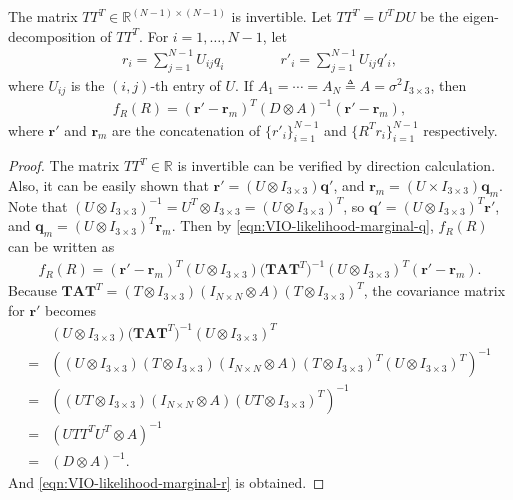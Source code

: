 \begin{theorem}
	The matrix $TT^T \in \mathbb{R}^{(N-1)\times (N-1)}$ is invertible.
	Let $TT^T = U^TDU$ be the eigen-decomposition of $TT^T$.
	For $i = 1,\ldots,N-1$, let
	\begin{align} \label{eqn:VIO-uncorrelate}
		r_i = \sum_{j=1}^{N-1} U_{ij} q_i \qquad\qquad r'_i = \sum_{j=1}^{N-1} U_{ij} q'_i,
	\end{align}
	where $U_{ij}$ is the $(i,j)$-th entry of $U$.
	If $A_1 = \cdots = A_N \triangleq A = \sigma^2I_{3\times 3}$, then
	\begin{align} \label{eqn:VIO-likelihood-marginal-r}
		f_R(R) = (\bm{r}'-\bm{r}_m)^T (D\otimes A)^{-1} (\bm{r}'-\bm{r}_m),
	\end{align}
	where $\bm{r}'$ and $\bm{r}_m$ are the concatenation of $\{r'_i\}_{i=1}^{N-1}$ and $\{R^T r_i\}_{i=1}^{N-1}$ respectively.
\end{theorem}
\begin{proof}
	The matrix $TT^T \in \mathbb{R}$ is invertible can be verified by direction calculation.
	Also, it can be easily shown that $\bm{r}' = (U\otimes I_{3\times 3}) \bm{q}'$, and $\bm{r}_m = (U\times I_{3\times 3})\bm{q}_m$.
	Note that $(U\otimes I_{3\times 3})^{-1} = U^T\otimes I_{3\times 3} = (U\otimes I_{3\times 3})^T$, so $\bm{q}' = (U\otimes I_{3\times 3})^T \bm{r}'$, and $\bm{q}_m = (U\otimes I_{3\times 3})^T \bm{r}_m$.
	Then by \eqref{eqn:VIO-likelihood-marginal-q}, $f_R(R)$ can be written as
	\begin{align*}
		f_R(R) = (\bm{r}'-\bm{r}_m)^T (U\otimes I_{3\times 3}) \big(\mathbf{T}\mathbf{A}\mathbf{T}^T\big)^{-1} (U\otimes I_{3\times 3})^T (\bm{r}'-\bm{r}_m).
	\end{align*}
	Because $\mathbf{T}\mathbf{A}\mathbf{T}^T = (T\otimes I_{3\times 3})(I_{N\times N}\otimes A)(T\otimes I_{3\times 3})^T$, the covariance matrix for $\bm{r}'$ becomes
	\begin{align*}
		&(U\otimes I_{3\times 3}) \big(\mathbf{T}\mathbf{A}\mathbf{T}^T\big)^{-1} (U\otimes I_{3\times 3})^T \\
		= &\left( (U\otimes I_{3\times 3}) (T\otimes I_{3\times 3}) (I_{N\times N}\otimes A) (T\otimes I_{3\times 3})^T (U\otimes I_{3\times 3})^T \right)^{-1} \\
		= &\left( (UT\otimes I_{3\times 3}) (I_{N\times N}\otimes A) (UT\otimes I_{3\times 3})^T \right)^{-1} \\
		= &(UTT^TU^T \otimes A)^{-1} \\
		= &(D\otimes A)^{-1}.
	\end{align*}
	And \eqref{eqn:VIO-likelihood-marginal-r} is obtained.
\end{proof}


